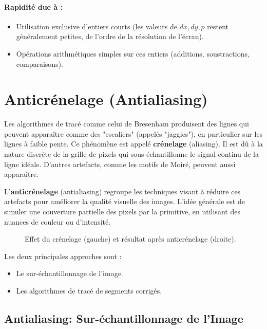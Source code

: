\documentclass{article}
\begin{document}
\paragraph{Rapidité due à :}
\begin{itemize}
    \item Utilisation exclusive d'entiers courts (les valeurs de $dx, dy, p$ restent généralement petites, de l'ordre de la résolution de l'écran).
    \item Opérations arithmétiques simples sur ces entiers (additions, soustractions, comparaisons).
\end{itemize}

\section{Anticrénelage (Antialiasing)}

Les algorithmes de tracé comme celui de Bresenham produisent des lignes qui peuvent apparaître comme des "escaliers" (appelés "jaggies"), en particulier sur les lignes à faible pente. Ce phénomène est appelé \textbf{crénelage} (aliasing). Il est dû à la nature discrète de la grille de pixels qui sous-échantillonne le signal continu de la ligne idéale. D'autres artefacts, comme les motifs de Moiré, peuvent aussi apparaître.

L'\textbf{anticrénelage} (antialiasing) regroupe les techniques visant à réduire ces artefacts pour améliorer la qualité visuelle des images. L'idée générale est de simuler une couverture partielle des pixels par la primitive, en utilisant des nuances de couleur ou d'intensité.

\begin{figure}[H]
\centering
\caption{Effet du crénelage (gauche) et résultat après anticrénelage (droite).}
\label{fig:aliasing_vs_antialiasing}
\end{figure}

Les deux principales approches sont :
\begin{itemize}
    \item Le sur-échantillonnage de l'image.
    \item Les algorithmes de tracé de segments corrigés.
\end{itemize}

\subsection{Antialiasing: Sur-échantillonnage de l'Image}
\end{document}

